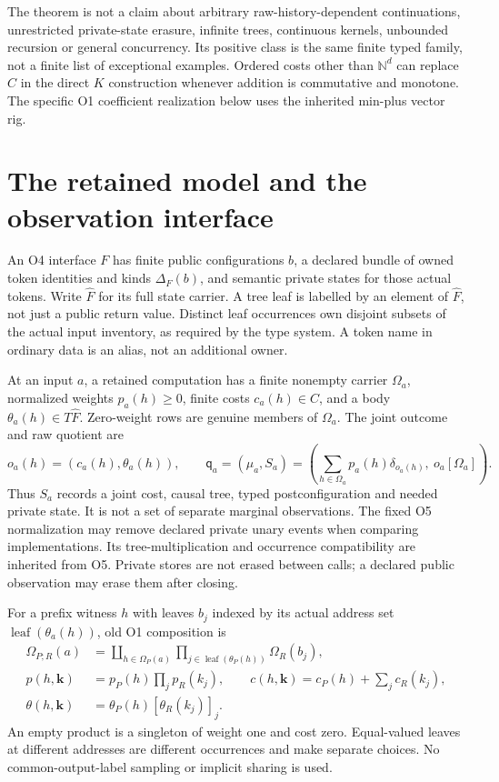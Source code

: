 \documentclass[11pt,a4paper]{article}
\theoremstyle{definition}
\newcommand{\leaf}{\operatorname{leaf}}
\newcommand{\qobs}{\mathsf{q}}
\begin{document}
The theorem is not a claim about arbitrary raw-history-dependent
continuations, unrestricted private-state erasure, infinite trees,
continuous kernels, unbounded recursion or general concurrency. Its
positive class is the same finite typed family, not a finite list of
exceptional examples. Ordered costs other than $\mathbb N^d$ can replace
$C$ in the direct $K$ construction whenever addition is commutative and
monotone. The specific O1 coefficient realization below uses the inherited
min-plus vector rig.

\section{The retained model and the observation interface}\label{sec:raw}
An O4 interface $F$ has finite public configurations $b$, a declared
bundle of owned token identities and kinds $\Delta_F(b)$, and semantic
private states for those actual tokens. Write $\widehat F$ for its full
state carrier. A tree leaf is labelled by an element of $\widehat F$,
not just a public return value. Distinct leaf occurrences own disjoint
subsets of the actual input inventory, as required by the type system.
A token name in ordinary data is an alias, not an additional owner.

At an input $a$, a retained computation has a finite nonempty carrier
$\Omega_a$, normalized weights $p_a(h)\geq0$, finite costs $c_a(h)\in C$,
and a body $\theta_a(h)\in T\widehat F$. Zero-weight rows are genuine
members of $\Omega_a$. The joint outcome and raw quotient are
\begin{equation}\label{eq:raw-quotient}
 o_a(h)=(c_a(h),\theta_a(h)),\qquad
 \qobs_a=(\mu_a,S_a)
 =\left(\sum_{h\in\Omega_a}p_a(h)\delta_{o_a(h)},\ o_a[\Omega_a]\right).
\end{equation}
Thus $S_a$ records a joint cost, causal tree, typed postconfiguration and
needed private state. It is not a set of separate marginal observations.
The fixed O5 normalization may remove declared private unary events when
comparing implementations. Its tree-multiplication and occurrence
compatibility are inherited from O5. Private stores are not erased
between calls; a declared public observation may erase them after closing.

For a prefix witness $h$ with leaves $b_j$ indexed by its actual address
set $\leaf(\theta_a(h))$, old O1 composition is
\begin{equation}\label{eq:raw-bind}
\begin{split}
 \Omega_{P;R}(a)&=\coprod_{h\in\Omega_P(a)}
       \prod_{j\in\leaf(\theta_P(h))}\Omega_R(b_j),\\
 p(h,\mathbf k)&=p_P(h)\prod_jp_R(k_j),\qquad
 c(h,\mathbf k)=c_P(h)+\sum_jc_R(k_j),\\
 \theta(h,\mathbf k)&=\theta_P(h)[\theta_R(k_j)]_j.
\end{split}
\end{equation}
An empty product is a singleton of weight one and cost zero. Equal-valued
leaves at different addresses are different occurrences and make separate
choices. No common-output-label sampling or implicit sharing is used.
\end{document}
